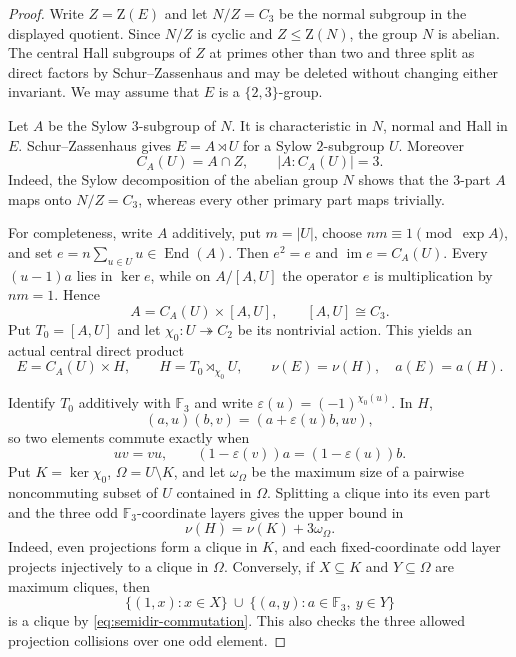 \documentclass[11pt]{article}
\theoremstyle{remark}
\newcommand{\nuG}{\nu}
\newcommand{\aG}{a}
\newcommand{\F}{\mathbb F}
\newcommand{\Z}{\mathrm Z}
\begin{document}
\begin{proof}
Write $Z=\Z(E)$ and let $N/Z=C_3$ be the normal subgroup in the displayed
quotient.  Since $N/Z$ is cyclic and $Z\le\Z(N)$, the group $N$ is abelian.
The central Hall subgroups of $Z$ at primes other than two and three split
as direct factors by Schur--Zassenhaus and may be deleted without changing
either invariant.  We may assume that $E$ is a $\{2,3\}$-group.

Let $A$ be the Sylow $3$-subgroup of $N$.  It is characteristic in $N$,
normal and Hall in $E$.  Schur--Zassenhaus gives
$E=A\rtimes U$ for a Sylow $2$-subgroup $U$.  Moreover
\[
 C_A(U)=A\cap Z,\qquad |A:C_A(U)|=3.
\]
Indeed, the Sylow decomposition of the abelian group $N$ shows that the
$3$-part $A$ maps onto $N/Z=C_3$, whereas every other primary part maps
trivially.

For completeness, write $A$ additively, put $m=|U|$, choose
$n m\equiv1\pmod{\exp A}$, and set
$e=n\sum_{u\in U}u\in\operatorname{End}(A)$.  Then $e^2=e$ and
$\operatorname{im}e=C_A(U)$.  Every $(u-1)a$ lies in $\ker e$, while on
$A/[A,U]$ the operator $e$ is multiplication by $nm=1$.  Hence
\[
 A=C_A(U)\times[A,U],\qquad [A,U]\cong C_3.
\]
Put $T_0=[A,U]$ and let $\chi_0:U\twoheadrightarrow C_2$ be its nontrivial
action.  This yields an actual central direct product
\begin{equation}
 E=C_A(U)\times H,\qquad H=T_0\rtimes_{\chi_0}U,\qquad
 \nuG(E)=\nuG(H),\quad \aG(E)=\aG(H).
\label{eq:remove-central-extension}
\end{equation}

Identify $T_0$ additively with $\F_3$ and write
$\varepsilon(u)=(-1)^{\chi_0(u)}$.  In $H$,
\[
 (a,u)(b,v)=(a+\varepsilon(u)b,uv),
\]
so two elements commute exactly when
\begin{equation}
 uv=vu,\qquad
 (1-\varepsilon(v))a=(1-\varepsilon(u))b.
\label{eq:semidir-commutation}
\end{equation}
Put $K=\ker\chi_0$, $\Omega=U\setminus K$, and let $\omega_\Omega$ be
the maximum size of a pairwise noncommuting subset of $U$ contained in
$\Omega$.  Splitting a clique into its even part and the three odd
$\F_3$-coordinate layers gives the upper bound in
\begin{equation}
 \boxed{\nuG(H)=\nuG(K)+3\omega_\Omega.}
\label{eq:semidir-clique-formula}
\end{equation}
Indeed, even projections form a clique in $K$, and each fixed-coordinate
odd layer projects injectively to a clique in $\Omega$.  Conversely, if
$X\subseteq K$ and $Y\subseteq\Omega$ are maximum cliques, then
\[
 \{(1,x):x\in X\}\ \cup\
 \{(a,y):a\in\F_3,\ y\in Y\}
\]
is a clique by \eqref{eq:semidir-commutation}.  This also checks the three
allowed projection collisions over one odd element.


\end{proof}
\end{document}
